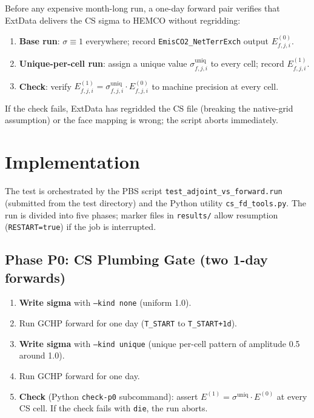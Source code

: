 \documentclass[12pt]{article}
\begin{document}
Before any expensive month-long run, a one-day forward pair verifies that
ExtData delivers the CS sigma to HEMCO without regridding:
\begin{enumerate}
  \item \textbf{Base run}: $\sigma \equiv 1$ everywhere; record
        \texttt{EmisCO2\_NetTerrExch} output $E^{(0)}_{f,j,i}$.
  \item \textbf{Unique-per-cell run}: assign a unique value
        $\sigma^{\mathrm{uniq}}_{f,j,i}$ to every cell; record
        $E^{(1)}_{f,j,i}$.
  \item \textbf{Check}: verify $E^{(1)}_{f,j,i} = \sigma^{\mathrm{uniq}}_{f,j,i}
        \cdot E^{(0)}_{f,j,i}$ to machine precision at every cell.
\end{enumerate}
If the check fails, ExtData has regridded the CS file (breaking the
native-grid assumption) or the face mapping is wrong; the script aborts
immediately.

\section{Implementation}

The test is orchestrated by the PBS script
\texttt{test\_adjoint\_vs\_forward.run} (submitted from the test directory)
and the Python utility \texttt{cs\_fd\_tools.py}.  The run is divided into
five phases; marker files in \texttt{results/} allow resumption
(\texttt{RESTART=true}) if the job is interrupted.

\subsection{Phase P0: CS Plumbing Gate (two 1-day forwards)}

\begin{enumerate}
  \item \textbf{Write sigma} with \texttt{--kind none} (uniform 1.0).
  \item Run GCHP forward for one day (\texttt{T\_START} to
        \texttt{T\_START+1d}).
  \item \textbf{Write sigma} with \texttt{--kind unique} (unique per-cell
        pattern of amplitude 0.5 around 1.0).
  \item Run GCHP forward for one day.
  \item \textbf{Check} (Python \texttt{check-p0} subcommand): assert
        $E^{(1)} = \sigma^{\mathrm{uniq}} \cdot E^{(0)}$ at every CS cell.
        If the check fails with \texttt{die}, the run aborts.
\end{enumerate}
\end{document}
